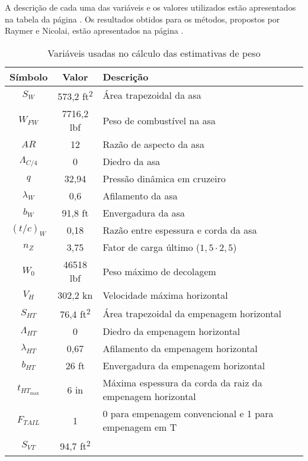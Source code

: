   A descrição de cada uma das variáveis e os valores utilizados estão apresentados na tabela da página \pageref{tbl:estimativasPeso}.
	Os resultados obtidos para os métodos, propostos por Raymer e Nicolai, estão apresentados na página \pageref{tbl:estimativasPeso_resultados}.

  \begin{table}[h]
		\label{tbl:estimativasPeso}
    \caption{Variáveis usadas no cálculo das estimativas de peso}
    \centering
    \begin{tabular}{ccl}
      \toprule
      Símbolo & Valor & Descrição \\
      \midrule
      $ S_W $
				& 573,2 \si{ft^2}
				& Área trapezoidal da asa
			\\
			$ W_{FW} $
				& 7716,2 \si{lbf}
				& Peso de combustível na asa
			\\
			$ AR $
				& 12
				& Razão de aspecto da asa
			\\
			$ \Lambda_{C/4} $
				& 0
				& Diedro da asa
			\\
			$ q $
				& 32,94
				& Pressão dinâmica em cruzeiro
			\\
			$ \lambda_W $
				& 0,6
				& Afilamento da asa
			\\
			$ b_W $
				& 91,8 \si{ft}
				& Envergadura da asa
			\\
			$ {(t/c)}_W $
				& 0,18
				& Razão entre espessura e corda da asa
			\\
			$ n_Z $
				& 3,75
				& Fator de carga último ($1,5 \cdot 2,5$)
			\\
			$ W_0 $
				& 46518 \si{lbf}
				& Peso máximo de decolagem
			\\
			$ V_H $
				& 302,2 \si{kn}
				& Velocidade máxima horizontal
			\\
			$ S_{HT} $
				& 76,4 \si{ft^2}
				& Área trapezoidal da empenagem horizontal
			\\
			$ \Lambda_{HT} $
				& 0
				& Diedro da empenagem horizontal
			\\
			$ \lambda_{HT} $
				& 0,67
				& Afilamento da empenagem horizontal
			\\
			$ b_{HT} $
				& 26 \si{ft}
				& Envergadura da empenagem horizontal
			\\
			$ t_{HT_{\max}} $
				& 6 \si{in}
				& Máxima espessura da corda da raiz da empenagem horizontal
			\\
			$ F_{TAIL} $
				& 1
				& 0 para empenagem convencional e 1 para empenagem em T
			\\
			$ S_{VT} $
				& 94,7 \si{ft^2}

\end{tabular}
\end{table}
